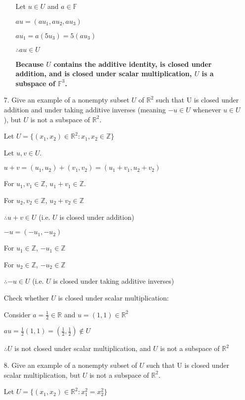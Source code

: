 \documentclass{article}
\begin{document}
\begin{enumerate}[nolistsep]
\begin{enumerate}[nolistsep]
			Let $u \in U$ and $a \in \mathbb{F}$
			
			$au = (au_1, au_2, au_3)$
			
			$au_1 = a(5u_3) = 5(au_3)$
			
			$\therefore au \in U$
			
			\textbf{Because $U$ contains the additive identity, is closed under addition, and is closed under scalar multiplication, $U$ is a subspace of $\mathbb{F}^3$.}
			
		\end{enumerate}
		
		\item[7.] Give an example of a nonempty subset $U$ of $\mathbb{R}^2$ such that U is closed under addition and under taking additive inverses (meaning $-u \in U$ whenever $u \in U$), but $U$ is not a subspace of $\mathbb{R}^2$.
		
		Let $U = \{(x_1, x_2) \in \mathbb{R}^2 : x_1, x_2 \in \mathbb{Z}\}$
		
		Let $u, v \in U$.
		
		$u + v = (u_1, u_2) + (v_1, v_2) = (u_1 + v_1, u_2 + v_2)$
		
		For $u_1, v_1 \in \mathbb{Z}$, $u_1 + v_1 \in \mathbb{Z}$.
		
		For $u_2, v_2 \in \mathbb{Z}$, $u_2 + v_2 \in \mathbb{Z}$
		
		$\therefore u + v \in U$ (i.e. $U$ is closed under addition)
		
		$-u = (-u_1, -u_2)$
		
		For $u_1 \in \mathbb{Z}$, $-u_1 \in \mathbb{Z}$
		
		For $u_2 \in \mathbb{Z}$, $-u_2 \in \mathbb{Z}$
		
		$\therefore -u \in U$ (i.e. $U$ is closed under taking additive inverses)
		
		Check whether $U$ is closed under scalar multiplication:
		
		Consider $a = \frac{1}{2} \in \mathbb{R}$ and $u = (1, 1) \in \mathbb{R}^2$
		
		$au = \frac{1}{2}(1, 1) = (\frac{1}{2}, \frac{1}{2}) \not\in U$
		
		$\therefore U$ is not closed under scalar multiplication, and $U$ is not a subspace of $\mathbb{R}^2$
		
		\item[8.] Give an example of a nonempty subset of $U$ such that U is closed under scalar multiplication, but $U$ is not a subspace of $\mathbb{R}^2$.
		
		Let $U = \{(x_1, x_2) \in \mathbb{R}^2 : x_1^2 = x_2^2\}$
		

\end{enumerate}
\end{document}
